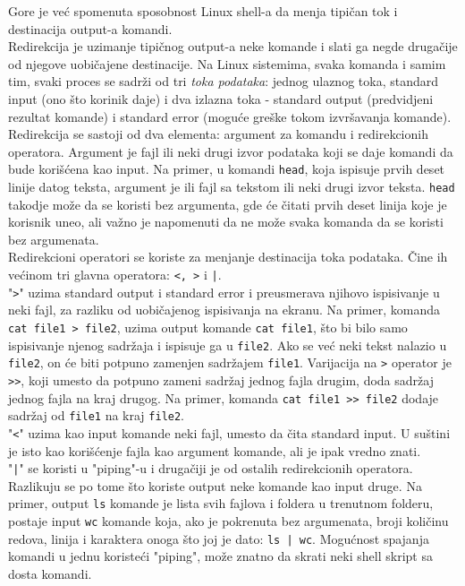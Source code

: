 Gore je već spomenuta sposobnost Linux shell-a da menja tipičan tok i destinacija output-a komandi.\\
Redirekcija je uzimanje tipičnog output-a neke komande i slati ga negde drugačije od njegove uobičajene destinacije. Na Linux sistemima, svaka komanda i samim tim, svaki proces se sadrži od tri \textit{toka podataka}: jednog ulaznog toka, standard input (ono što korinik daje) i dva izlazna toka - standard output (predvidjeni rezultat komande) i standard error (moguće greške tokom izvršavanja komande).\\
Redirekcija se sastoji od dva elementa: argument za komandu i redirekcionih operatora. Argument je fajl ili neki drugi izvor podataka koji se daje komandi da bude korišćena kao input. Na primer, u komandi \texttt{head}, koja ispisuje prvih deset linije datog teksta, argument je ili fajl sa tekstom ili neki drugi izvor teksta. \texttt{head} takodje može da se koristi bez argumenta, gde će čitati prvih deset linija koje je korisnik uneo, ali važno je napomenuti da ne može svaka komanda da se koristi bez argumenata.
\\
Redirekcioni operatori se koriste za menjanje destinacija toka podataka. Čine ih većinom tri glavna operatora: \texttt{<, >} i \texttt{|}.\\
"\texttt{>}" uzima standard output i standard error i preusmerava njihovo ispisivanje u neki fajl, za razliku od uobičajenog ispisivanja na ekranu. Na primer, komanda \texttt{cat file1 > file2}, uzima output komande \texttt{cat file1}, što bi bilo samo ispisivanje njenog sadržaja i ispisuje ga u \texttt{file2}. Ako se već neki tekst nalazio u \texttt{file2}, on će biti potpuno zamenjen sadržajem \texttt{file1}. Varijacija na \texttt{>} operator je \texttt{>>}, koji umesto da potpuno zameni sadržaj jednog fajla drugim, doda sadržaj jednog fajla na kraj drugog. Na primer, komanda \texttt{cat file1 >> file2} dodaje sadržaj od \texttt{file1} na kraj \texttt{file2}.\\
"\texttt{<}" uzima kao input komande neki fajl, umesto da čita standard input. U suštini je isto kao korišćenje fajla kao argument komande, ali je ipak vredno znati.\\
"\texttt{|}" se koristi u "piping"-u i  drugačiji je od ostalih redirekcionih operatora. Razlikuju se po tome što koriste 	output neke komande kao input druge. Na primer, output \texttt{ls} komande je lista svih fajlova i foldera u trenutnom folderu, postaje input \texttt{wc} komande koja, ako je pokrenuta bez argumenata, broji količinu redova, linija i karaktera onoga što joj je dato: 
\texttt{ls | wc}. Mogućnost spajanja komandi u jednu koristeći "piping", može znatno da skrati neki shell skript sa dosta komandi.
